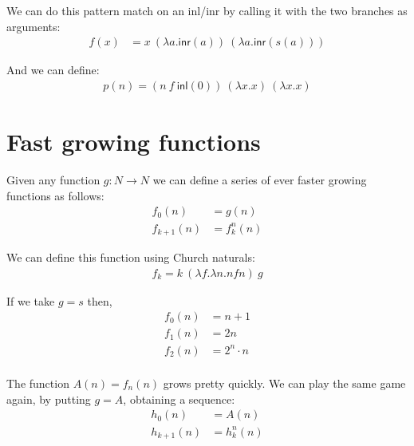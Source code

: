 \documentclass[a4paper, 11pt]{article}
\theoremstyle{definition}
\begin{document}
We can do this pattern match on an inl/inr by calling it with the two branches as arguments:
\begin{align*}
  f(x) &= x\ (\lambda a. \mathsf{inr}(a))\ (\lambda a.\mathsf{inr}(s(a)))
\end{align*}


And we can define:
\begin{align*}
  p(n) = (n\ f\ \mathsf{inl}(0))\ (\lambda x. x)\ (\lambda x. x)
\end{align*}

\section*{Fast growing functions}
Given any function $g : N \to N$ we can define a series of ever faster growing functions as follows:
\begin{align*}
  f_0(n) &= g(n)\\
  f_{k+1}(n) &= f^n_k(n)
\end{align*}

We can define this function using Church naturals:
\begin{align*}
  f_k = k\ (\lambda f. \lambda n. n f n)\ g
\end{align*}

If we take $g = s$ then,
\begin{align*}
  f_0(n) &= n+1\\
  f_1(n) &= 2n\\
  f_2(n) &= 2^n \cdot n\\
\end{align*}

The function $A(n) = f_n(n)$ grows pretty quickly. We can play the same game again, by putting $g = A$, obtaining a sequence:
\begin{align*}
  h_0(n) &= A(n)\\
  h_{k+1}(n) &= h^n_k(n)
\end{align*}
\end{document}
